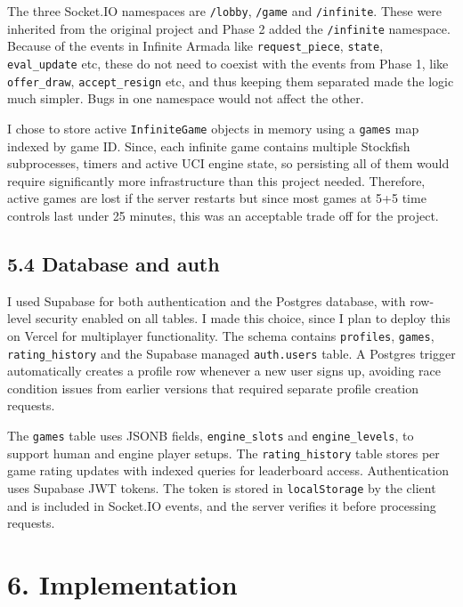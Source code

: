 \documentclass[11pt,a4paper]{article}
\begin{document}
The three Socket.IO namespaces are \texttt{/lobby}, \texttt{/game} and \texttt{/infinite}. These were inherited from the original project and Phase 2 added the \texttt{/infinite} namespace. Because of the events in Infinite Armada like \texttt{request\_piece}, \texttt{state}, \texttt{eval\_update} etc, these do not need to coexist with the events from Phase 1, like \texttt{offer\_draw}, \texttt{accept\_resign} etc, and thus keeping them separated made the logic much simpler. Bugs in one namespace would not affect the other.

I chose to store active \texttt{InfiniteGame} objects in memory using a \texttt{games} map indexed by game ID. Since, each infinite game contains multiple Stockfish subprocesses, timers and active UCI engine state, so persisting all of them would require significantly more infrastructure than this project needed. Therefore, active games are lost if the server restarts but since most games at 5+5 time controls last under 25 minutes, this was an acceptable trade off for the project.

\subsection*{5.4 Database and auth}
I used Supabase for both authentication and the Postgres database, with row-level security enabled on all tables. I made this choice, since I plan to deploy this on Vercel for multiplayer functionality. The schema contains \texttt{profiles}, \texttt{games}, \texttt{rating\_history} and the Supabase managed \texttt{auth.users} table. A Postgres trigger automatically creates a profile row whenever a new user signs up, avoiding race condition issues from earlier versions that required separate profile creation requests.

The \texttt{games} table uses JSONB fields, \texttt{engine\_slots} and \texttt{engine\_levels}, to support human and engine player setups. The \texttt{rating\_history} table stores per game rating updates with indexed queries for leaderboard access. Authentication uses Supabase JWT tokens. The token is stored in \texttt{localStorage} by the client and is included in Socket.IO events, and the server verifies it before processing requests.

\newpage
\section*{6. Implementation}
\end{document}
